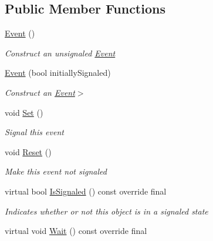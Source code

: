 \subsection*{Public Member Functions}
\begin{DoxyCompactItemize}
\item 
\mbox{\hyperlink{class_command_lib_1_1_event_a165569ddb4788df6b3fad0e52df5e78c}{Event}} ()
\begin{DoxyCompactList}\small\item\em Construct an unsignaled \mbox{\hyperlink{class_command_lib_1_1_event}{Event}}\end{DoxyCompactList}\item 
\mbox{\hyperlink{class_command_lib_1_1_event_a6b00a5faf7e17ea1b5b2984e33309277}{Event}} (bool initially\+Signaled)
\begin{DoxyCompactList}\small\item\em Construct an \mbox{\hyperlink{class_command_lib_1_1_event}{Event}}$>$\end{DoxyCompactList}\item 
void \mbox{\hyperlink{class_command_lib_1_1_event_a321cb0c97c92012908816b0ced0dcc84}{Set}} ()
\begin{DoxyCompactList}\small\item\em Signal this event\end{DoxyCompactList}\item 
void \mbox{\hyperlink{class_command_lib_1_1_event_a9674a73be80ce75b7438c1d03942bd9e}{Reset}} ()
\begin{DoxyCompactList}\small\item\em Make this event not signaled\end{DoxyCompactList}\item 
\mbox{\label{class_command_lib_1_1_event_a943dcf40e6b9fa09df19cd3fa870788e}} 
virtual bool \mbox{\hyperlink{class_command_lib_1_1_event_a943dcf40e6b9fa09df19cd3fa870788e}{Is\+Signaled}} () const override final
\begin{DoxyCompactList}\small\item\em Indicates whether or not this object is in a signaled state \end{DoxyCompactList}\item 
\mbox{\label{class_command_lib_1_1_event_a26986edd42eaa6b85b5a4ddc32af60ae}} 
virtual void \mbox{\hyperlink{class_command_lib_1_1_event_a26986edd42eaa6b85b5a4ddc32af60ae}{Wait}} () const override final

\end{DoxyCompactItemize}

